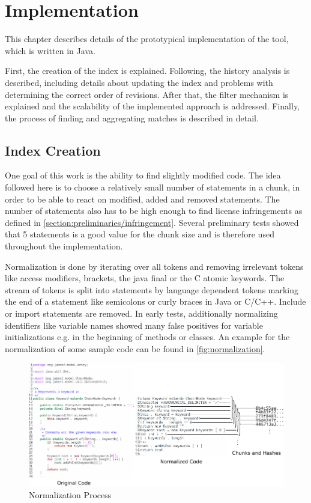 
\chapter{Implementation}\label{chapter:implementation}
This chapter describes details of the prototypical implementation of the tool, which is written in Java.

First, the creation of the index is explained.
Following, the history analysis is described, including details about updating the index and problems with determining the correct order of revisions.
After that, the filter mechanism is explained and the scalability of the implemented approach is addressed.
Finally, the process of finding and aggregating matches is described in detail.


\section{Index Creation}\label{section:implementation/index_creation}
One goal of this work is the ability to find slightly modified code.
The idea followed here is to choose a relatively small number of statements in a chunk, in order to be able to react on modified, added and removed statements.
The number of statements also has to be high enough to find license infringements as defined in \autoref{section:preliminaries/infringement}.
Several preliminary tests showed that 5 statements is a good value for the chunk size and is therefore used throughout the implementation.

Normalization is done by iterating over all tokens and removing irrelevant tokens like access modifiers, brackets, the java final or the C atomic keywords.
The stream of tokens is split into statements by language dependent tokens marking the end of a statement like semicolons or curly braces in Java or C/C++.
Include or import statements are removed.
In early tests, additionally normalizing identifiers like variable names showed many false positives for variable initializations e.g. in the beginning of methods or classes.
An example for the normalization of some sample code can be found in \autoref{fig:normalization}.

\begin{figure}[h]
	\centering
	\includegraphics[width=\linewidth]{figures/normalization.pdf}
	\caption{Normalization Process}\label{fig:normalization}
\end{figure}

